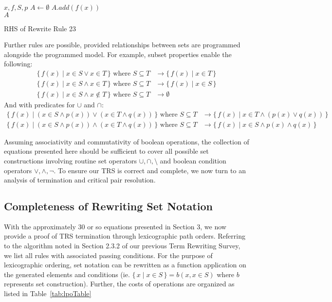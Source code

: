 \documentclass{article}
\newcommand{\Set}[2]{%
  \{\, #1 \mid #2 \, \}%
}
\begin{document}
    \begin{algorithm}[h]
    \begin{algorithmic}
      \Require $x,f,S,p$
      \State $A \gets \emptyset$
      \State $A.add(f(x))$
      \EndIf
      \EndFor\\
      \Return $A$
    \end{algorithmic}
    \caption{RHS of Rewrite Rule 23}
      \label{fig:eq17alg}
    \end{algorithm}



Further rules are possible, provided relationships between sets are programmed alongside the programmed model. For example, subset properties enable the following:
\begin{align}
  \Set{f(x)}{x \in S \lor x \in T} \text{ where } S \subseteq T &\rightarrow \Set{f(x)}{x \in T}\\
  \Set{f(x)}{x \in S \land x \in T} \text{ where } S \subseteq T &\rightarrow \Set{f(x)}{x \in S}\\
  \Set{f(x)}{x \in S \land x \notin T} \text{ where } S \subseteq T &\rightarrow \emptyset
\end{align}
And with predicates for $\cup$ and $\cap$:
\begin{align}
  \Set{f(x)}{(x \in S \land p(x)) \lor (x \in T \land q(x))} \text{ where } S \subseteq T &\rightarrow \Set{f(x)}{x \in T \land (p(x) \lor q(x))}\\
  \Set{f(x)}{(x \in S \land p(x)) \land (x \in T \land q(x))} \text{ where } S \subseteq T &\rightarrow \Set{f(x)}{x \in S \land p(x) \land q(x)}
\end{align}

Assuming associativity and commutativity of boolean operations, the collection of equations presented here should be sufficient to cover all possible set constructions involving routine set operators $\cup, \cap, \setminus$ and boolean condition operators $\lor, \land, \lnot$. To ensure our TRS is correct and complete, we now turn to an analysis of termination and critical pair resolution.

\subsection{Completeness of Rewriting Set Notation}

With the approximately 30 or so equations presented in Section 3, we now provide a proof of TRS termination through lexicographic path orders. Referring to the algorithm noted in Section 2.3.2 of our previous Term Rewriting Survey, we list all rules with associated passing conditions. For the purpose of lexicographic ordering, set notation can be rewritten as a function application on the generated elements and conditions (ie. $\Set{x}{x \in S} = b(x, x\in S)$ where $b$ represents set construction). Further, the costs of operations are organized as listed in Table~\ref{tab:lpoTable}
\end{document}
